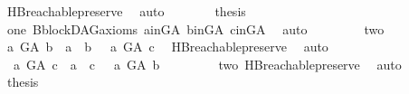 \begin{isabellebody}
\ HB{}{\isachardot}{\kern0pt}reachable{}{\isacharunderscore}{\kern0pt}preserve\ \isamarkupfalse%
\ auto\isanewline
\ \ \ \ \isamarkupfalse%
\ \isamarkupfalse%
\ {\isacharquery}{\kern0pt}thesis\ \isamarkupfalse%
\ one\ B{}{\isachardot}{\kern0pt}blockDAG{\isacharunderscore}{\kern0pt}axioms\ a{\isacharunderscore}{\kern0pt}in{\isacharunderscore}{\kern0pt}G{\isacharunderscore}{\kern0pt}A\ b{\isacharunderscore}{\kern0pt}in{\isacharunderscore}{\kern0pt}G{\isacharunderscore}{\kern0pt}A\ c{\isacharunderscore}{\kern0pt}in{\isacharunderscore}{\kern0pt}G{\isacharunderscore}{\kern0pt}A\ \isamarkupfalse%
\ auto\isanewline
\ \ \isamarkupfalse%
\isanewline
\ \ \ \ \isamarkupfalse%
\ two\isanewline
\ \ \ \ \isamarkupfalse%
\ \isamarkupfalse%
\ {\isachardoublequoteopen}{\isasymnot}{\isacharparenleft}{\kern0pt}{\isacharparenleft}{\kern0pt}a\ {\isasymrightarrow}\isactrlsup {\isacharplus}{\kern0pt}\isactrlbsub G{\isacharunderscore}{\kern0pt}A\isactrlesub \ b\ {\isasymor}\ a\ {\isacharequal}{\kern0pt}\ b{\isacharparenright}{\kern0pt}\ {\isasymand}\ {\isacharparenleft}{\kern0pt}{\isasymnot}\ a\ {\isasymrightarrow}\isactrlsup {\isacharplus}{\kern0pt}\isactrlbsub G{\isacharunderscore}{\kern0pt}A\isactrlesub \ c{\isacharparenright}{\kern0pt}{\isacharparenright}{\kern0pt}{\isachardoublequoteclose}\ \isamarkupfalse%
\ HB{}{\isachardot}{\kern0pt}reachable{}{\isacharunderscore}{\kern0pt}preserve\ \isamarkupfalse%
\ auto\isanewline
\ \ \ \ \isamarkupfalse%
\ \isamarkupfalse%
\ {\isachardoublequoteopen}\ {\isacharparenleft}{\kern0pt}a\ {\isasymrightarrow}\isactrlsup {\isacharplus}{\kern0pt}\isactrlbsub G{\isacharunderscore}{\kern0pt}A\isactrlesub \ c\ {\isasymor}\ a\ {\isacharequal}{\kern0pt}\ c{\isacharparenright}{\kern0pt}\ {\isasymand}\ {\isacharparenleft}{\kern0pt}{\isasymnot}\ a\ {\isasymrightarrow}\isactrlsup {\isacharplus}{\kern0pt}\isactrlbsub G{\isacharunderscore}{\kern0pt}A\isactrlesub \ b{\isacharparenright}{\kern0pt}{\isachardoublequoteclose}\ \isanewline
\ \ \ \ \ \ \isamarkupfalse%
\ two\ HB{}{\isachardot}{\kern0pt}reachable{}{\isacharunderscore}{\kern0pt}preserve\ \isamarkupfalse%
\ auto\isanewline
\ \ \ \ \isamarkupfalse%
\ \isamarkupfalse%
\ {\isacharquery}{\kern0pt}thesis\ \isamarkupfalse%

\end{isabellebody}

